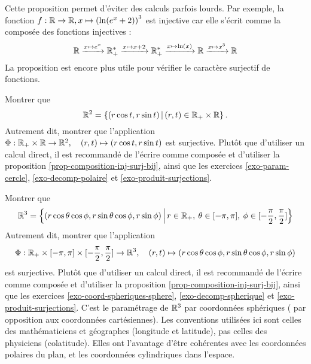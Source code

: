\begin{exemple}
Cette proposition permet d'éviter des calculs parfois lourds. Par exemple, la fonction $f : \mathbb{R}\to \mathbb{R}, x\mapsto \left(\ln(e^x+2)\right)^3$ est injective car elle s'écrit comme la composée des fonctions injectives :
\[ \mathbb{R} \xrightarrow{x\mapsto e^x} \mathbb{R}_+^* \xrightarrow{x\mapsto x+2} \mathbb{R}_+^* \xrightarrow{x\mapsto \ln(x)} \mathbb{R} \xrightarrow{x\mapsto x^3}\mathbb{R}\]
La proposition est encore plus utile pour vérifier le caractère surjectif de fonctions.
\end{exemple}

\begin{exercice}\label{exo-coord-polaires-plan}
Montrer que 
\[\R^2 = \ensemble{(r\cos t, r\sin t)}{(r,t) \in \R_+\times \R}.\]
Autrement dit, montrer que l'application $\Phi : \mathbb{R}_+\times \mathbb{R} \to \mathbb{R}^2, \quad (r,t) \mapsto (r\cos t, r\sin t)$ est surjective. Plutôt que d'utiliser un calcul direct, il est recommandé de l'écrire comme composée et d'utiliser la proposition \ref{prop-composition-inj-surj-bij}, ainsi que les exercices \ref{exo-param-cercle}, \ref{exo-decomp-polaire}  et \ref{exo-produit-surjections}.
\end{exercice}

\begin{exercice}\label{exo-coord-spheriques-espace}
Montrer que 
\[ \R^3 = \ensemble{(r\cos\theta\cos\phi, r\sin\theta\cos\phi, r\sin\phi)}{r\in\R_+, \: \theta \in [-\pi,\pi], \: \phi\in[-\frac{\pi}{2},\frac{\pi}{2}]}\]
Autrement dit, montrer que l'application 
\[\Phi : \mathbb{R}_+\times [-\pi,\pi]\times [-\frac{\pi}{2},\frac{\pi}{2}] \to \mathbb{R}^3, \quad 
(r,t) \mapsto (r\cos\theta\cos\phi, r\sin\theta\cos\phi, r\sin\phi)
\]
est surjective. Plutôt que d'utiliser un calcul direct, il est recommandé de l'écrire comme composée et d'utiliser la proposition \ref{prop-composition-inj-surj-bij}, ainsi que les exercices \ref{exo-coord-spheriques-sphere}, \ref{exo-decomp-spherique}  et \ref{exo-produit-surjections}.
C'est le paramétrage de $\mathbb{R}^3$ par coordonnées sphériques  ( par opposition aux coordonnées cartésiennes). Les conventions utilisées ici sont celles des mathématiciens et géographes (longitude et latitude), pas celles des physiciens (colatitude). Elles ont l'avantage d'être cohérentes avec les coordonnées polaires du plan, et les coordonnées cylindriques dans l'espace.
\end{exercice}


